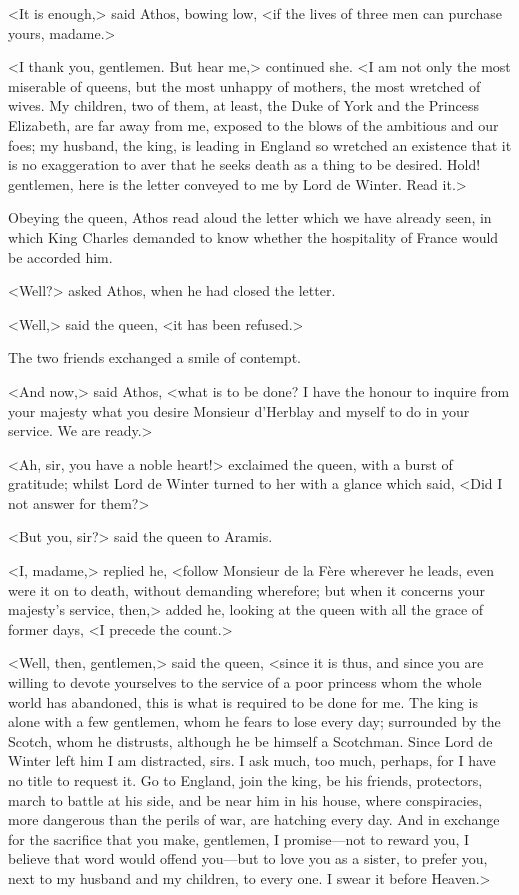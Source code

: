 <It is enough,> said Athos, bowing low, <if the lives of three men can purchase yours, madame.>

<I thank you, gentlemen. But hear me,> continued she. <I am not only the most miserable of queens, but the most unhappy of mothers, the most wretched of wives. My children, two of them, at least, the Duke of York and the Princess Elizabeth, are far away from me, exposed to the blows of the ambitious and our foes; my husband, the king, is leading in England so wretched an existence that it is no exaggeration to aver that he seeks death as a thing to be desired. Hold! gentlemen, here is the letter conveyed to me by Lord de Winter. Read it.>

Obeying the queen, Athos read aloud the letter which we have already seen, in which King Charles demanded to know whether the hospitality of France would be accorded him.

<Well?> asked Athos, when he had closed the letter.

<Well,> said the queen, <it has been refused.>

The two friends exchanged a smile of contempt.

<And now,> said Athos, <what is to be done? I have the honour to inquire from your majesty what you desire Monsieur d'Herblay and myself to do in your service. We are ready.>

<Ah, sir, you have a noble heart!> exclaimed the queen, with a burst of gratitude; whilst Lord de Winter turned to her with a glance which said, <Did I not answer for them?>

<But you, sir?> said the queen to Aramis.

<I, madame,> replied he, <follow Monsieur de la Fère wherever he leads, even were it on to death, without demanding wherefore; but when it concerns your majesty's service, then,> added he, looking at the queen with all the grace of former days, <I precede the count.>

<Well, then, gentlemen,> said the queen, <since it is thus, and since you are willing to devote yourselves to the service of a poor princess whom the whole world has abandoned, this is what is required to be done for me. The king is alone with a few gentlemen, whom he fears to lose every day; surrounded by the Scotch, whom he distrusts, although he be himself a Scotchman. Since Lord de Winter left him I am distracted, sirs. I ask much, too much, perhaps, for I have no title to request it. Go to England, join the king, be his friends, protectors, march to battle at his side, and be near him in his house, where conspiracies, more dangerous than the perils of war, are hatching every day. And in exchange for the sacrifice that you make, gentlemen, I promise—not to reward you, I believe that word would offend you—but to love you as a sister, to prefer you, next to my husband and my children, to every one. I swear it before Heaven.>

